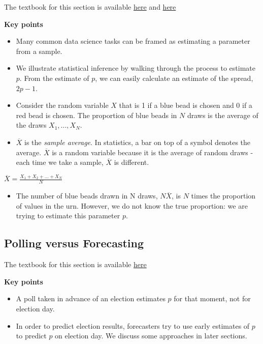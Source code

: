 \documentclass[
]{article}
\providecommand{\tightlist}{%
  \setlength{\itemsep}{0pt}\setlength{\parskip}{0pt}}
\begin{document}
The textbook for this section is available
\href{https://rafalab.github.io/dsbook/inference.html\#the-sample-average}{here}
and
\href{https://rafalab.github.io/dsbook/inference.html\#parameters}{here}

\textbf{Key points}

\begin{itemize}
\tightlist
\item
  Many common data science tasks can be framed as estimating a parameter
  from a sample.
\item
  We illustrate statistical inference by walking through the process to
  estimate \(p\). From the estimate of \(p\), we can easily calculate an
  estimate of the spread, \(2p - 1\).
\item
  Consider the random variable \(X\) that is 1 if a blue bead is chosen
  and 0 if a red bead is chosen. The proportion of blue beads in \(N\)
  draws is the average of the draws \(X_1,...,X_N\).
\item
  \(\overline{X}\) is the \emph{sample average}. In statistics, a bar on
  top of a symbol denotes the average. \(\overline{X}\) is a random
  variable because it is the average of random draws - each time we take
  a sample, \(\overline{X}\) is different.
\end{itemize}

\(\overline{X} = \frac{X_1+X_2+...+X_N}{N}\)

\begin{itemize}
\tightlist
\item
  The number of blue beads drawn in N draws, \(N \overline{X}\), is
  \(N\) times the proportion of values in the urn. However, we do not
  know the true proportion: we are trying to estimate this parameter
  \(p\).
\end{itemize}

\hypertarget{polling-versus-forecasting}{%
\subsection{Polling versus
Forecasting}\label{polling-versus-forecasting}}

The textbook for this section is available
\href{https://rafalab.github.io/dsbook/inference.html\#polling-versus-forecasting}{here}

\textbf{Key points}

\begin{itemize}
\tightlist
\item
  A poll taken in advance of an election estimates \(p\) for that
  moment, not for election day.
\item
  In order to predict election results, forecasters try to use early
  estimates of \(p\) to predict \(p\) on election day. We discuss some
  approaches in later sections.
\end{itemize}
\end{document}
